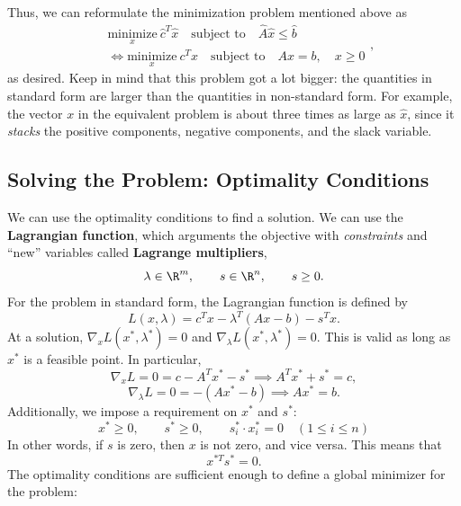 \documentclass[letterpaper]{article}
\begin{document}
Thus, we can reformulate the minimization problem mentioned above as 
\[\begin{aligned}
    &\underset{x}{\text{minimize}} \ \hat{c}^T \hat{x} \quad \text{subject to} \quad \hat{A}\hat{x} \leq \hat{b} \\ 
    &\iff \underset{x}{\text{minimize}} \ c^T x \quad \text{subject to} \quad Ax = b, \quad x \geq 0
\end{aligned},\]
as desired. Keep in mind that this problem got a lot bigger: the quantities in standard form are larger than the quantities in non-standard form. For example, the vector $x$ in the equivalent problem is about three times as large as $\hat{x}$, since it \emph{stacks} the positive components, negative components, and the slack variable. 

\subsection{Solving the Problem: Optimality Conditions}
We can use the optimality conditions to find a solution. We can use the \textbf{Lagrangian function}, which arguments the objective with \emph{constraints} and ``new'' variables called \textbf{Lagrange multipliers}, 
\[\lambda \in \R^m, \qquad s \in \R^n, \qquad s \geq 0.\]
For the problem in standard form, the Lagrangian function is defined by 
\[L(x, \lambda) = c^T x - \lambda^T (Ax - b) - s^T x.\]
At a solution, $\nabla_{x} L(x^*, \lambda^*) = 0$ and $\nabla_{\lambda} L(x^*, \lambda^*) = 0$. This is valid as long as $x^*$ is a feasible point. In particular,
\[\nabla_{x} L = 0 = c - A^T x^* - s^* \implies A^T x^* + s^* = c,\]
\[\nabla_{\lambda} L = 0 = -(A x^* - b) \implies Ax^* = b.\]
Additionally, we impose a requirement on $x^*$ and $s^*$:
\[x^* \geq 0, \qquad s^* \geq 0, \qquad s_i^* \cdot x_i^* = 0 \quad (1 \leq i \leq n)\]
In other words, if $s$ is zero, then $x$ is not zero, and vice versa. This means that \[x^{*T} s^* = 0.\]
The optimality conditions are sufficient enough to define a global minimizer for the problem:
\end{document}
